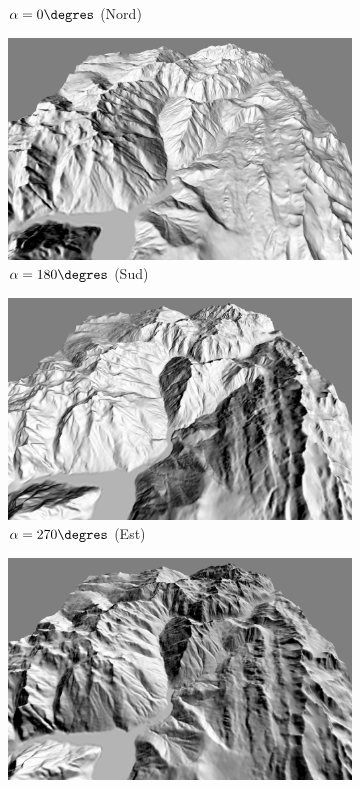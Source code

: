 \begin{figure}[h!]
\begin{subfigure}[t]{0.24\linewidth}
   \caption{$\alpha = 0\degres$ (Nord)}
 \end{subfigure}
 \begin{subfigure}[t]{0.24\linewidth}
   \centering
   \includegraphics[width=1.0\linewidth]{Resultats/2_sud_lambert.png}
   \caption{$\alpha = 180\degres$ (Sud)}
 \end{subfigure}
 \begin{subfigure}[t]{0.24\linewidth}
   \centering
   \includegraphics[width=1.0\linewidth]{Resultats/2_est_lambert.png}
   \caption{$\alpha = 270\degres$ (Est)}
 \end{subfigure}
 \begin{subfigure}[t]{0.24\linewidth}
   \centering
   \includegraphics[width=1.0\linewidth]{Resultats/2_nordest_lambert.png}

\end{subfigure}
\end{figure}
